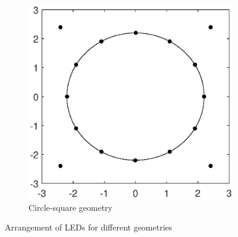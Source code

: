 \documentclass[slidestop,usepdftitle=false]{gvvslides}
\begin{document}
\begin{frame}
\begin{figure}[h!]
    \begin{subfigure}[t]{0.5\columnwidth}
        \centering
        \includegraphics[scale=.25]{LedArrangementPaper}
        \caption{Circle-square geometry }
\label{fig1:subfig4}
    \end{subfigure}
       \caption{Arrangement of LEDs for different geometries}
    \label{geometries}
\end{figure}
\end{frame}
\end{document}
